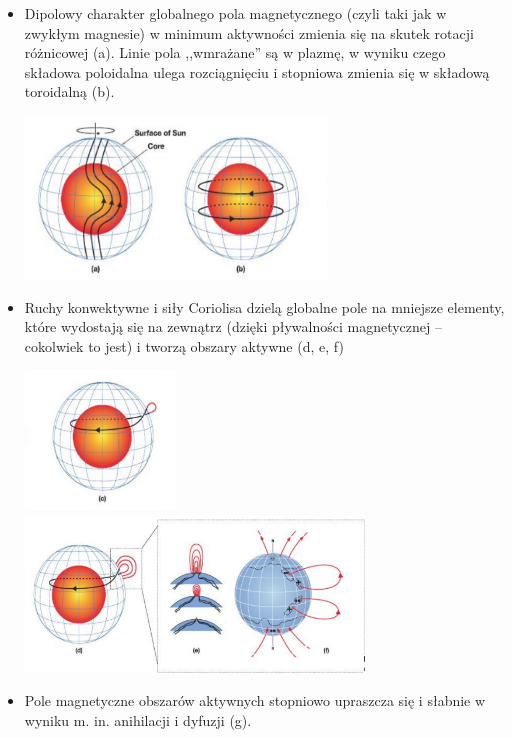 \documentclass[../index.tex]{subfiles}
\begin{document}
        \begin{itemize}
            \item Dipolowy charakter globalnego pola magnetycznego (czyli taki jak w zwykłym magnesie) w minimum aktywności zmienia się na skutek rotacji różnicowej (a). Linie pola ,,wmrażane'' są w plazmę, w wyniku czego składowa poloidalna ulega rozciągnięciu i stopniowa zmienia się w składową toroidalną (b).
            \begin{center}
                \includegraphics[width=8cm]{images/dynamoSloneczne1.png}
            \end{center}
            \item Ruchy konwektywne i siły Coriolisa dzielą globalne pole na mniejsze elementy, które wydostają się na zewnątrz (dzięki pływalności magnetycznej – cokolwiek to jest) i tworzą obszary aktywne (d, e, f)
            \begin{center}
                \includegraphics[width=4cm]{images/dynamoSloneczne2.png}
                \includegraphics[width=9cm]{images/dynamoSloneczne3.png}
            \end{center}
            \item Pole magnetyczne obszarów aktywnych stopniowo upraszcza się i słabnie w wyniku m. in. anihilacji i dyfuzji (g).

\end{itemize}
\end{document}
